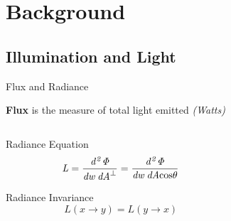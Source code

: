 \documentclass[10pt,compress,professionalfont]{beamer}
\begin{document}
\section{Background}
\subsection{Illumination and Light}
\begin{frame}{Flux and Radiance}

    {\bf Flux} is the measure of total light emitted \textit{(Watts)}

    \begin{columns}
        \begin{column}{0.6\textwidth}
            \begin{block}{Radiance Equation}
                \[
                \mathit{L} = \frac{\mathit{d^{2}\Phi}}{\mathit{dw\:dA}^\perp} = \frac{\mathit{d^{2}\Phi}}{\mathit{dw\:dA}\textup{cos}\theta}
                \]
            \end{block}
            \begin{block}{Radiance Invariance}
                \[
                    L(x \to y) = L(y \to x)
                \]
            \end{block}
        \end{column}
        \begin{column}{0.4\textwidth}
            \vspace{-5mm}
            {\centering
}
\end{column}
\end{columns}
\end{frame}
\end{document}
